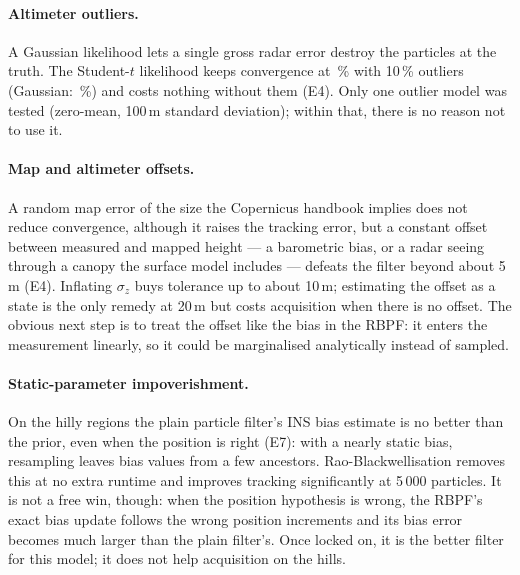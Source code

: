 \paragraph{Altimeter outliers.} A Gaussian likelihood lets a single gross radar error destroy the
particles at the truth. The Student-$t$ likelihood keeps convergence at
\EFourOutliersHillOneZeroPfStudentTConv\,\% with 10\,\% outliers (Gaussian:
\EFourOutliersHillOneZeroPfFiveZeroZeroZeroConv\,\%) and costs nothing without them (E4). Only one
outlier model was tested (zero-mean, 100\,m standard deviation); within that, there is no reason not
to use it.

\paragraph{Map and altimeter offsets.} A random map error of the size the Copernicus handbook
implies does not reduce convergence, although it raises the tracking error, but a constant offset between measured and mapped height --- a barometric
bias, or a radar seeing through a canopy the surface model includes --- defeats the filter beyond
about 5\,m (E4). Inflating $\sigma_z$ buys tolerance up to about 10\,m; estimating the offset as a
state is the only remedy at 20\,m but costs acquisition when there is no offset. The obvious next
step is to treat the offset like the bias in the RBPF: it enters the measurement linearly, so it
could be marginalised analytically instead of sampled.

\paragraph{Static-parameter impoverishment.} On the hilly regions the plain particle filter's INS
bias estimate is no better than the prior, even when the position is right (E7): with a nearly
static bias, resampling leaves bias values from a few ancestors. Rao-Blackwellisation removes this at
no extra runtime and improves tracking significantly at 5\,000 particles. It is not a free win,
though: when the position hypothesis is wrong, the RBPF's exact bias update follows the wrong
position increments and its bias error becomes much larger than the plain filter's. Once locked on,
it is the better filter for this model; it does not help acquisition on the hills.

